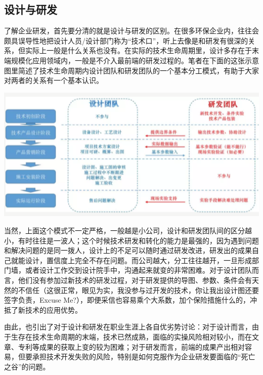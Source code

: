 \documentclass[]{book}
\begin{document}
\hypertarget{ux8bbeux8ba1ux4e0eux7814ux53d1}{%
\subsection{设计与研发}\label{ux8bbeux8ba1ux4e0eux7814ux53d1}}

了解企业研发，首先要分清的就是设计与研发的区别。在很多环保企业内，往往会颇具误导性地把设计人员/设计部门称为``技术口''，听上去像是和研发有很深的关系，但实际上一般是什么关系也没有。在实际的技术生命周期里，设计多存在于末端规模化应用领域内，一般是不介入最前端的研发过程的。笔者在下面的这张示意图里简述了技术生命周期内设计团队和研发团队的一个基本分工模式，有助于大家对两者的关系有一个基本认识。

\includegraphics[width=6.67in]{images/qiye2}

当然，上面这个模式不一定严格，一般越是小公司，设计和研发团队间的区分越小，有时往往是一波人；这个时候技术研发和转化的能力是最强的，因为遇到问题和解决问题的是同一拨人，设计上的不足可以随时通过研发改进，研发出的成果自己就能设计，置信度上完全不存在问题。而公司越大，分工往往越开，一旦形成部门墙，或者设计工作交到设计院手中，沟通起来就变的非常困难。对于设计团队而言，他们没有参加过新技术的研发过程，对于研发提供的导图、参数、条件会有天然的不信任（这很正常，眼见为实，我没参与过开发的技术，你让我出设计图还要签字负责，Excuse Me?），即便采信也容易乘个大系数，加个保险措施什么的，冲抵了新技术的应用优势。

由此，也引出了对于设计和研发在职业生涯上各自优劣势讨论：对于设计而言，由于生存在技术生命周期的末端，技术已然成熟，面临的实操风险相对较小，而在文章、专利等成果的获取上变的较为困难；对于研发而言，前端的成果产出相对容易，但要承担技术开发失败的风险，特别是如何克服作为企业研发要面临的``死亡之谷''的问题。
\end{document}
